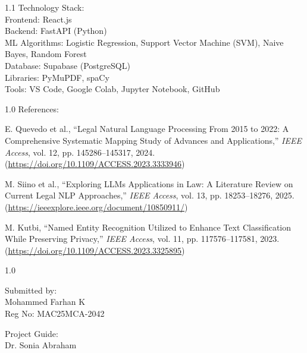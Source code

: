 \documentclass[12pt, a4paper]{article}
\begin{document}
\vspace{6pt}
\begin{spacing}{1.1}
\noindent Technology Stack: \\
Frontend: React.js \\
Backend: FastAPI (Python) \\
ML Algorithms: Logistic Regression, Support Vector Machine (SVM), Naive Bayes, Random Forest \\
Database: Supabase (PostgreSQL) \\
Libraries: PyMuPDF, spaCy \\
Tools: VS Code, Google Colab, Jupyter Notebook, GitHub
\end{spacing}

\vspace{8pt}
\begin{spacing}{1.0}
\noindent References:
\begin{enumerate}[label={[\arabic*]}, leftmargin=*, itemsep=0pt, parsep=0pt, topsep=2pt]
    \item E. Quevedo et al., ``Legal Natural Language Processing From 2015 to 2022: A Comprehensive Systematic Mapping Study of Advances and Applications,'' \textit{IEEE Access}, vol. 12, pp. 145286--145317, 2024. (\url{https://doi.org/10.1109/ACCESS.2023.3333946})
    \item M. Siino et al., ``Exploring LLMs Applications in Law: A Literature Review on Current Legal NLP Approaches,'' \textit{IEEE Access}, vol. 13, pp. 18253--18276, 2025. (\url{https://ieeexplore.ieee.org/document/10850911/})
    \item M. Kutbi, ``Named Entity Recognition Utilized to Enhance Text Classification While Preserving Privacy,'' \textit{IEEE Access}, vol. 11, pp. 117576--117581, 2023. (\url{https://doi.org/10.1109/ACCESS.2023.3325895})
\end{enumerate}
\end{spacing}

\vfill %

\begin{spacing}{1.0}
\noindent
\begin{minipage}[t]{0.5\textwidth}
    Submitted by: \\
    Mohammed Farhan K \\
    Reg No: MAC25MCA-2042
\end{minipage}%
\begin{minipage}[t]{0.5\textwidth}
    \raggedleft
    Project Guide: \\
    Dr. Sonia Abraham
\end{minipage}
\end{spacing}
\end{document}
